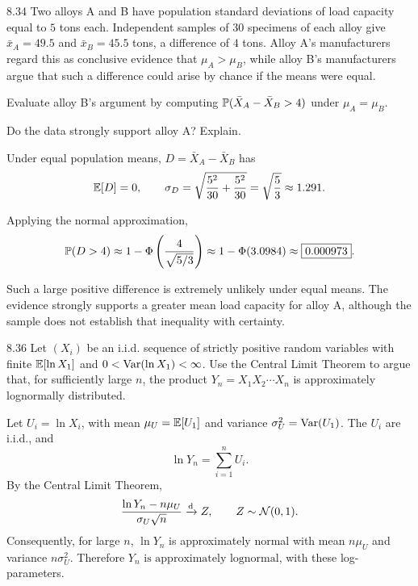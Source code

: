 \documentclass[11pt,oneside]{article}
\begin{document}
\begin{exercise}{8.34}
Two alloys A and B have population standard deviations of load capacity equal to $5$ tons each. Independent samples of $30$ specimens of each alloy give $\bar x_A=49.5$ and $\bar x_B=45.5$ tons, a difference of $4$ tons. Alloy A's manufacturers regard this as conclusive evidence that $\mu_A>\mu_B$, while alloy B's manufacturers argue that such a difference could arise by chance if the means were equal.
\begin{exercisesubparts}
\item Evaluate alloy B's argument by computing $\mathbb{P}(\bar X_A-\bar X_B>4)$ under $\mu_A=\mu_B$.
\item Do the data strongly support alloy A? Explain.
\end{exercisesubparts}
\end{exercise}
\begin{solution}
Under equal population means, $D=\bar X_A-\bar X_B$ has
\[
\mathbb{E}[D]=0, \qquad
\sigma_D=\sqrt{\frac{5^2}{30}+\frac{5^2}{30}}=\sqrt{\frac53}\approx1.291.
\]
\begin{exercisesubparts}
\item Applying the normal approximation,
\[
\mathbb{P}(D>4)
\approx1-\Phi\left(\frac{4}{\sqrt{5/3}}\right)
\approx1-\Phi(3.0984)\approx\boxed{0.000973}.
\]
\item Such a large positive difference is extremely unlikely under equal means. The evidence strongly supports a greater mean load capacity for alloy A, although the sample does not establish that inequality with certainty.
\end{exercisesubparts}
\end{solution}

\begin{exercise}{8.36}
Let $(X_i)$ be an i.i.d. sequence of strictly positive random variables with finite $\mathbb{E}[\ln X_1]$ and $0<\operatorname{Var}(\ln X_1)<\infty$. Use the Central Limit Theorem to argue that, for sufficiently large $n$, the product $Y_n=X_1X_2\cdots X_n$ is approximately lognormally distributed.
\end{exercise}
\begin{solution}
Let $U_i=\ln X_i$, with mean $\mu_U=\mathbb{E}[U_1]$ and variance $\sigma_U^2=\operatorname{Var}(U_1)$. The $U_i$ are i.i.d., and
\[
\ln Y_n=\sum_{i=1}^n U_i.
\]
By the Central Limit Theorem,
\[
\frac{\ln Y_n-n\mu_U}{\sigma_U\sqrt n}\xrightarrow{\mathrm{d}}Z,
\qquad Z\sim\mathcal{N}(0, 1).
\]
Consequently, for large $n$, $\ln Y_n$ is approximately normal with mean $n\mu_U$ and variance $n\sigma_U^2$. Therefore $\boxed{Y_n\text{ is approximately lognormal}}$, with these log-parameters.
\end{solution}
\end{document}
